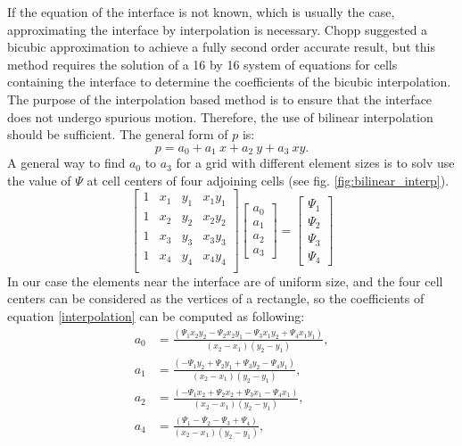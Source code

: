 \documentclass[review]{elsarticle}
\begin{document}
If the equation of the interface is not known, which is usually the case, approximating the interface by interpolation is necessary. Chopp suggested a bicubic approximation \cite{Chopp2001} to achieve a fully second order accurate result, but this method requires the solution of a 16 by 16 system of equations for cells containing the interface to determine the coefficients of the bicubic interpolation. 
The purpose of the interpolation based method is to ensure that the interface does not undergo spurious motion.
Therefore, the use of bilinear interpolation should be sufficient. The general form of $p$ is:
\begin{equation}\label{interpolation}
p=a_0+a_1 \ x+ a_2 \ y+ a_3 \ xy.
\end{equation} 
A general way to find $a_0$ to $a_3$ for a grid with different element sizes is to solv%
use the value of $\varPsi$  
at cell centers of four adjoining cells (see fig. \ref{fig:bilinear_interp}).
\begin{equation}
\label{bilin_system}
\begin{bmatrix}
    1 & x_1 & y_1 & x_1 y_1 \\
    1 & x_2 & y_2 & x_2 y_2 \\
    1 & x_3 & y_3 & x_3 y_3 \\
    1 & x_4 & y_4 & x_4 y_4 \\
\end{bmatrix}
\begin{bmatrix}
    a_0 \\
    a_1 \\
    a_2 \\
    a_3
\end{bmatrix}
=
\begin{bmatrix}
    \varPsi_1  \\
   \varPsi_2  \\
    \varPsi_3  \\
     \varPsi_4  
\end{bmatrix}
\end{equation} 
In our case the elements near the interface are of uniform size, and the four cell centers can be considered as the vertices of a rectangle, so the coefficients of 
equation \eqref{interpolation} can be computed as following:
\begin{subequations}
\begin{align}
a_0&=\frac{(\varPsi_1 x_2 y_2 - \varPsi_2 x_2 y_1 - \varPsi_3 x_1 y_2 + \varPsi_4 x_1 y_1)}{(x_2-x_1)(y_2-y_1)}, \\ 
a_1&=\frac{(-\varPsi_1 y_2 + \varPsi_2 y_1 + \varPsi_3 y_2 - \varPsi_4 y_1)}{(x_2-x_1)(y_2-y_1)},\\
a_2&=\frac{(-\varPsi_1 x_2 + \varPsi_2 x_2 + \varPsi_3 x_1 - \varPsi_4 x_1 )}{(x_2-x_1)(y_2-y_1)}, \\ 
a_4&=\frac{(\varPsi_1 - \varPsi_2 - \varPsi_3 + \varPsi_4)}{(x_2-x_1)(y_2-y_1)}, \\ 
\end{align}
\end{subequations}
\end{document}
